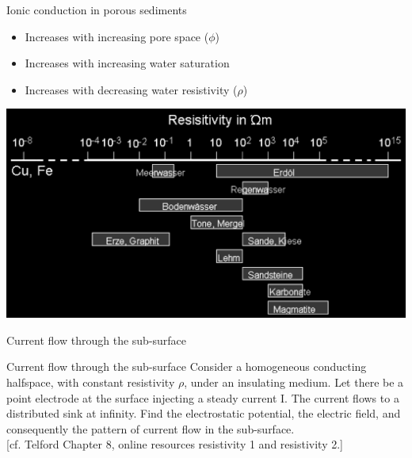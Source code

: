 \begin{frame}
  \begin{PointSix}{Ionic conduction in porous sediments}
    \small
    \begin{itemize}
      \item Increases with increasing pore space ($\phi$)
      \item Increases with increasing water saturation
      \item Increases with decreasing water resistivity ($\rho$)
    \end{itemize}
    \normalsize
    \end{PointSix}
\end{frame}

\begin{frame}
   \begin{center}
    \includegraphics[width=0.8\linewidth]{Figures/Resistivity/ResistivityMaterials.png}
    
  \end{center}
\end{frame}

\begin{frame}{Current flow through the sub-surface}
  \begin{PointSix}{Current flow through the sub-surface}
    \small
    Consider a homogeneous conducting halfspace, with constant resistivity $\rho$, under an insulating medium. Let there be a point electrode at the surface
injecting a steady current I. The current flows to a distributed sink at infinity. Find the electrostatic potential, the electric field, and consequently the pattern of current flow in the sub-surface.
  \\
  \vspace{1 cm}
  \tiny  [cf. Telford Chapter 8, online resources resistivity 1 and resistivity 2.]
  \end{PointSix}
\end{frame}

